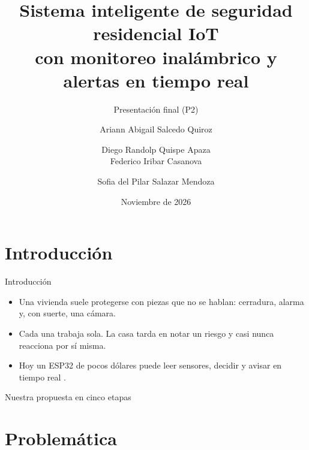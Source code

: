 \documentclass[aspectratio=169,10pt]{beamer}
\title[Seguridad residencial IoT]{Sistema inteligente de seguridad residencial IoT\\
  con monitoreo inalámbrico y alertas en tiempo real}
\subtitle{Presentación final (P2)}
\author[Salcedo, Quispe, Iribar, Salazar]{Ariann Abigail Salcedo Quiroz \and
  Diego Randolp Quispe Apaza \\ Federico Iribar Casanova \and
  Sofia del Pilar Salazar Mendoza}
\institute[UTEC]{Internet de las Cosas\\Universidad de Ingeniería y Tecnología}
\date[Nov. 2026]{Noviembre de 2026}
\begin{document}
\begin{frame}
  \titlepage
\end{frame}

\section{Introducción}

\begin{frame}{Introducción}
  \begin{itemize}
    \item Una vivienda suele protegerse con piezas que no se hablan: cerradura, alarma y, con suerte, una cámara.
    \item Cada una trabaja sola. La casa tarda en notar un riesgo y casi nunca reacciona por sí misma.
    \item Hoy un ESP32 de pocos dólares puede leer sensores, decidir y avisar en tiempo real \cite{alfuqaha2015survey, oktafiani2025esp32}.
  \end{itemize}
  \vspace{4mm}
  \begin{block}{Nuestra propuesta en cinco etapas}
    \centering
  \end{block}
\end{frame}

\section{Problemática}
\end{document}
